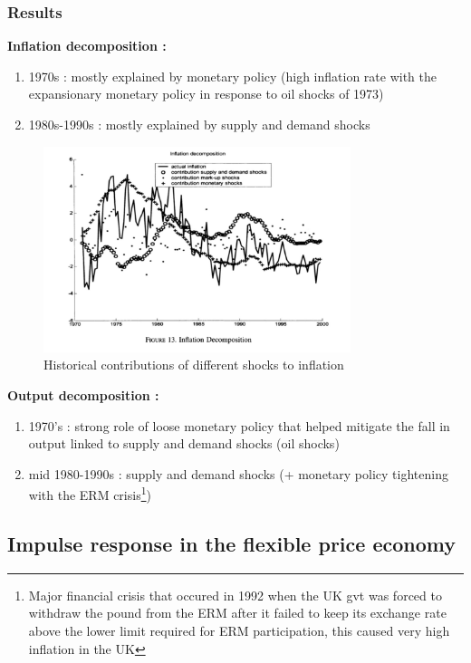 \documentclass{article}
\begin{document}
\subsubsection{Results}

\textbf{Inflation decomposition : }
    \begin{enumerate}
        \item 1970s  : mostly explained by monetary policy (high inflation rate with the expansionary monetary policy in response to oil shocks of 1973)
        \item 1980s-1990s : mostly explained by supply and demand shocks 
    \end{enumerate}

\begin{figure}[H]  
    \centering  
    \includegraphics[width=0.8\textwidth]{Pictures/Screenshot 2025-03-27 at 2.18.20 PM.png}  
    \caption{Historical contributions of different shocks to inflation}  
    \label{fig:myimage}  
\end{figure}

\textbf{Output decomposition :}
    \begin{enumerate}
        \item 1970's : strong role of loose monetary policy that helped mitigate the fall in output linked to supply and demand shocks (oil shocks)
        \item mid 1980-1990s : supply and demand shocks (+ monetary policy tightening with the ERM crisis\footnote{Major financial crisis that occured in 1992 when the UK gvt was forced to withdraw the pound from the ERM after it failed to keep its exchange rate above the lower limit required for ERM participation, this caused very high inflation in the UK})
    \end{enumerate}

\subsection{Impulse response in the flexible price economy }
\end{document}

